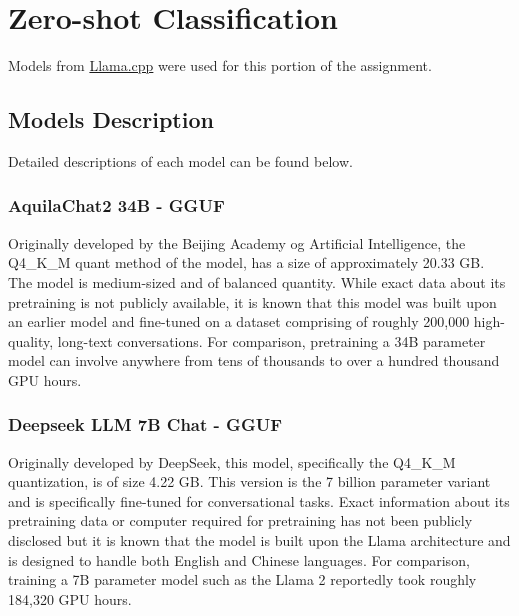 \documentclass[titlepage]{article}
\begin{document}
\section{Zero-shot Classification}
Models from \href{https://github.com/ggml-org/llama.cpp}{Llama.cpp} were used for this portion of the assignment.

\subsection{Models Description}
Detailed descriptions of each model can be found below.

\subsubsection{AquilaChat2 34B - GGUF}
Originally developed by the Beijing Academy og Artificial Intelligence, the Q4\_K\_M quant method of the model, has a
size of approximately 20.33 GB. The model is medium-sized and of balanced quantity. While exact data about its pretraining 
is not publicly available, it is known that this model was built upon an earlier model and fine-tuned on a dataset comprising 
of roughly 200,000 high-quality, long-text conversations. For comparison, pretraining a 34B parameter model can involve 
anywhere from tens of thousands to over a hundred thousand GPU hours. 

\subsubsection{Deepseek LLM 7B Chat - GGUF}
Originally developed by DeepSeek, this model, specifically the Q4\_K\_M quantization, is of size 4.22 GB.
This version is the 7 billion parameter variant and is specifically fine-tuned for conversational tasks. 
Exact information about its pretraining data or computer required for pretraining has not been publicly 
disclosed but it is known that the model is built upon the Llama architecture and is designed to handle both English 
and Chinese languages. For comparison, training a 7B parameter model such as the Llama 2 reportedly took roughly 
184,320 GPU hours.
\end{document}

